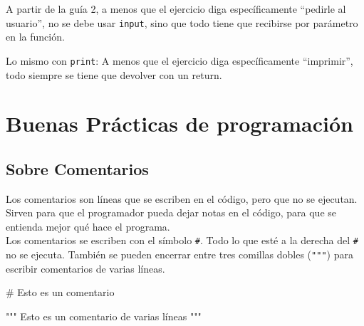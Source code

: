 \documentclass[
  letterpaper,
  DIV=11,
  numbers=noendperiod]{scrreprt}
\newenvironment{Shaded}{\begin{snugshade}}{\end{snugshade}}
\newcommand{\CommentTok}[1]{\textcolor[rgb]{0.37,0.37,0.37}{#1}}
\begin{document}
\begin{tcolorbox}[enhanced jigsaw, colframe=quarto-callout-warning-color-frame, opacityback=0, opacitybacktitle=0.6, bottomrule=.15mm, toprule=.15mm, coltitle=black, breakable, colback=white, leftrule=.75mm, titlerule=0mm, bottomtitle=1mm, toptitle=1mm, rightrule=.15mm, title=\textcolor{quarto-callout-warning-color}{\faExclamationTriangle}\hspace{0.5em}{¡Cuidado!}, arc=.35mm, left=2mm, colbacktitle=quarto-callout-warning-color!10!white]

A partir de la guía 2, a menos que el ejercicio diga específicamente
``pedirle al usuario'', no se debe usar \texttt{input}, sino que todo
tiene que recibirse por parámetro en la función.

Lo mismo con \texttt{print}: A menos que el ejercicio diga
específicamente ``imprimir'', todo siempre se tiene que devolver con un
return.

\end{tcolorbox}

\hypertarget{buenas-pruxe1cticas-de-programaciuxf3n}{%
\section{Buenas Prácticas de
programación}\label{buenas-pruxe1cticas-de-programaciuxf3n}}

\hypertarget{sobre-comentarios}{%
\subsection{Sobre Comentarios}\label{sobre-comentarios}}

Los comentarios son líneas que se escriben en el código, pero que no se
ejecutan. Sirven para que el programador pueda dejar notas en el código,
para que se entienda mejor qué hace el programa.\\
Los comentarios se escriben con el símbolo \texttt{\#}. Todo lo que esté
a la derecha del \texttt{\#} no se ejecuta. También se pueden encerrar
entre tres comillas dobles (\texttt{"""}) para escribir comentarios de
varias líneas.

\begin{Shaded}
\begin{Highlighting}[]
\CommentTok{\# Esto es un comentario}

\CommentTok{""" Esto es un comentario}
\CommentTok{de varias líneas """}
\end{Highlighting}
\end{Shaded}
\end{document}
